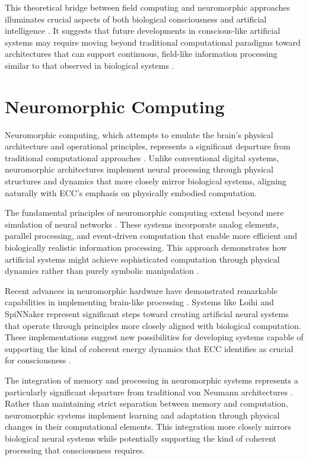\begin{refsection}
This theoretical bridge between field computing and neuromorphic approaches illuminates crucial aspects of both biological consciousness and artificial intelligence \cite{Verschure2019}. It suggests that future developments in conscious-like artificial systems may require moving beyond traditional computational paradigms toward architectures that can support continuous, field-like information processing similar to that observed in biological systems \cite{Werbos2018}.

\section{Neuromorphic Computing}

Neuromorphic computing, which attempts to emulate the brain's physical architecture and operational principles, represents a significant departure from traditional computational approaches \cite{Adamatzky2020a}. Unlike conventional digital systems, neuromorphic architectures implement neural processing through physical structures and dynamics that more closely mirror biological systems, aligning naturally with ECC's emphasis on physically embodied computation.

The fundamental principles of neuromorphic computing extend beyond mere simulation of neural networks \cite{Benjamin2019}. These systems incorporate analog elements, parallel processing, and event-driven computation that enable more efficient and biologically realistic information processing. This approach demonstrates how artificial systems might achieve sophisticated computation through physical dynamics rather than purely symbolic manipulation \cite{Boahen2021}.

Recent advances in neuromorphic hardware have demonstrated remarkable capabilities in implementing brain-like processing \cite{Davies2018}. Systems like Loihi and SpiNNaker represent significant steps toward creating artificial neural systems that operate through principles more closely aligned with biological computation. These implementations suggest new possibilities for developing systems capable of supporting the kind of coherent energy dynamics that ECC identifies as crucial for consciousness \cite{Furber2017}.

The integration of memory and processing in neuromorphic systems represents a particularly significant departure from traditional von Neumann architectures \cite{Indiveri2020}. Rather than maintaining strict separation between memory and computation, neuromorphic systems implement learning and adaptation through physical changes in their computational elements. This integration more closely mirrors biological neural systems while potentially supporting the kind of coherent processing that consciousness requires.


\end{refsection}
